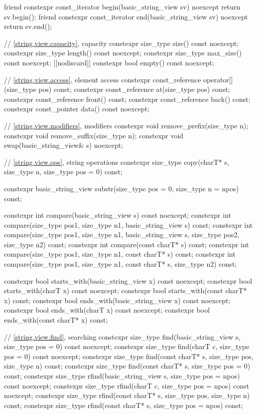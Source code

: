 \begin{codeblock}
{  friend constexpr const_iterator begin(basic_string_view sv) noexcept { return sv.begin(); }
  friend constexpr const_iterator end(basic_string_view sv) noexcept { return sv.end(); }

  // \ref{string.view.capacity}, capacity
  constexpr size_type size() const noexcept;
  constexpr size_type length() const noexcept;
  constexpr size_type max_size() const noexcept;
  [[nodiscard]] constexpr bool empty() const noexcept;

  // \ref{string.view.access}, element access
  constexpr const_reference operator[](size_type pos) const;
  constexpr const_reference at(size_type pos) const;
  constexpr const_reference front() const;
  constexpr const_reference back() const;
  constexpr const_pointer data() const noexcept;

  // \ref{string.view.modifiers}, modifiers
  constexpr void remove_prefix(size_type n);
  constexpr void remove_suffix(size_type n);
  constexpr void swap(basic_string_view& s) noexcept;

  // \ref{string.view.ops}, string operations
  constexpr size_type copy(charT* s, size_type n, size_type pos = 0) const;

  constexpr basic_string_view substr(size_type pos = 0, size_type n = npos) const;

  constexpr int compare(basic_string_view s) const noexcept;
  constexpr int compare(size_type pos1, size_type n1, basic_string_view s) const;
  constexpr int compare(size_type pos1, size_type n1, basic_string_view s,
                        size_type pos2, size_type n2) const;
  constexpr int compare(const charT* s) const;
  constexpr int compare(size_type pos1, size_type n1, const charT* s) const;
  constexpr int compare(size_type pos1, size_type n1, const charT* s, size_type n2) const;

  constexpr bool starts_with(basic_string_view x) const noexcept;
  constexpr bool starts_with(charT x) const noexcept;
  constexpr bool starts_with(const charT* x) const;
  constexpr bool ends_with(basic_string_view x) const noexcept;
  constexpr bool ends_with(charT x) const noexcept;
  constexpr bool ends_with(const charT* x) const;

  // \ref{string.view.find}, searching
  constexpr size_type find(basic_string_view s, size_type pos = 0) const noexcept;
  constexpr size_type find(charT c, size_type pos = 0) const noexcept;
  constexpr size_type find(const charT* s, size_type pos, size_type n) const;
  constexpr size_type find(const charT* s, size_type pos = 0) const;
  constexpr size_type rfind(basic_string_view s, size_type pos = npos) const noexcept;
  constexpr size_type rfind(charT c, size_type pos = npos) const noexcept;
  constexpr size_type rfind(const charT* s, size_type pos, size_type n) const;
  constexpr size_type rfind(const charT* s, size_type pos = npos) const;

}
\end{codeblock}
